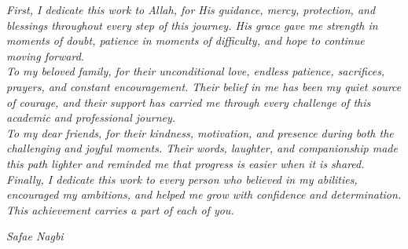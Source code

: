 \cleardoublepage
{}
{}

\begin{center}
  \vspace*{\fill}
  \begin{tcolorbox}[
    enhanced, colback=chaptercolor!5, colframe=accentgold,
    arc=3pt, boxrule=0.8pt, width=0.92\linewidth, center,
    left=18pt, right=18pt, top=12pt, bottom=12pt,
  ]
    \centering
    {\normalsize\itshape
    First, I dedicate this work to Allah, for His guidance, mercy,
    protection, and blessings throughout every step of this journey.
    His grace gave me strength in moments of doubt, patience in moments
    of difficulty, and hope to continue moving forward.\\[8pt]

    To my beloved family, for their unconditional love, endless patience,
    sacrifices, prayers, and constant encouragement. Their belief in me
    has been my quiet source of courage, and their support has carried
    me through every challenge of this academic and professional journey.\\[8pt]

    To my dear friends, for their kindness, motivation, and presence
    during both the challenging and joyful moments. Their words, laughter,
    and companionship made this path lighter and reminded me that progress
    is easier when it is shared.\\[8pt]

    Finally, I dedicate this work to every person who believed in my
    abilities, encouraged my ambitions, and helped me grow with confidence
    and determination.
    This achievement carries a part of each of you.\par}

    \vspace{10pt}
    {\small\color{gray}\textit{Safae Nagbi}}
  \end{tcolorbox}
  \vspace*{\fill}
\end{center}

\thispagestyle{plain}
